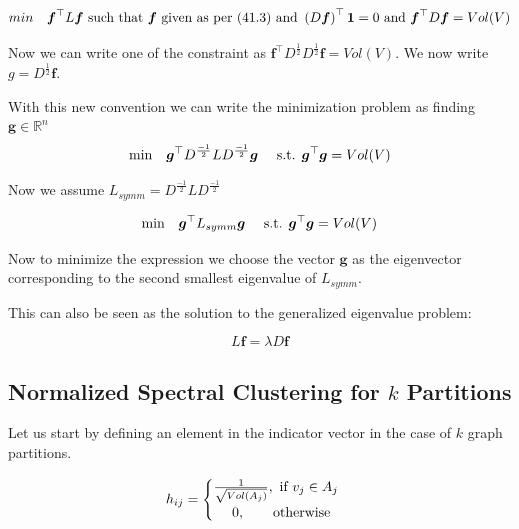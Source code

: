 \documentclass[english]{article}
\theoremstyle{plain}
\begin{document}
\begin{equation}
min\textnormal{\quad} \boldsymbol{f}^{\top}L\boldsymbol{f} \textnormal{ such that } \boldsymbol{f} \textnormal{ given as per (41.3) and } \left(D\boldsymbol{f}\right)^{\top}\boldsymbol{1}=0 \textnormal{ and }  \boldsymbol{f}^{\top}D\boldsymbol{f} = Vol(V)
\end{equation}

Now we can write one of the constraint as $\boldsymbol{f}^{\top}D^{\frac{1}{2}}D^{\frac{1}{2}}\boldsymbol{f} = Vol(V)$. We now write $g=D^{\frac{1}{2}}\boldsymbol{f}$.

With this new convention we can write the minimization problem as finding $\boldsymbol{g} \in \mathbb{R}^{n}$
\begin{equation}
\textnormal{min}\quad\boldsymbol{g}^{\top}D^{\frac{-1}{2}}LD^{\frac{-1}{2}}\boldsymbol{g} \quad   \textnormal{ s.t. }  \boldsymbol{g}^{\top}\boldsymbol{g} = Vol(V)
\end{equation}

Now we assume $L_{symm}= D^{\frac{-1}{2}}LD^{\frac{-1}{2}}$

\begin{equation}
\textnormal{min}\quad\boldsymbol{g}^{\top}L_{symm}\boldsymbol{g} \quad   \textnormal{ s.t. }  \boldsymbol{g}^{\top}\boldsymbol{g} = Vol(V)
\end{equation}

Now to minimize the expression we choose the vector $\boldsymbol{g}$ as the eigenvector corresponding to the second smallest eigenvalue of $L_{symm}$.

This can also be seen as the solution to the generalized eigenvalue problem:

\begin{equation}
L\boldsymbol{f} = \lambda D\boldsymbol{f}
\end{equation}

\subsection{Normalized Spectral Clustering for $k$ Partitions}

Let us start by defining an element in the indicator vector in the case of $k$ graph partitions.

\begin{equation}
h_{ij} = \begin{cases}
\frac{1}{\sqrt{Vol(A_{j})}}, \textnormal{ if } v_{j} \in A_{j} \\
\textnormal{  \quad   }0, \textnormal{\qquad otherwise}\\
\end{cases}
\end{equation}
\end{document}
